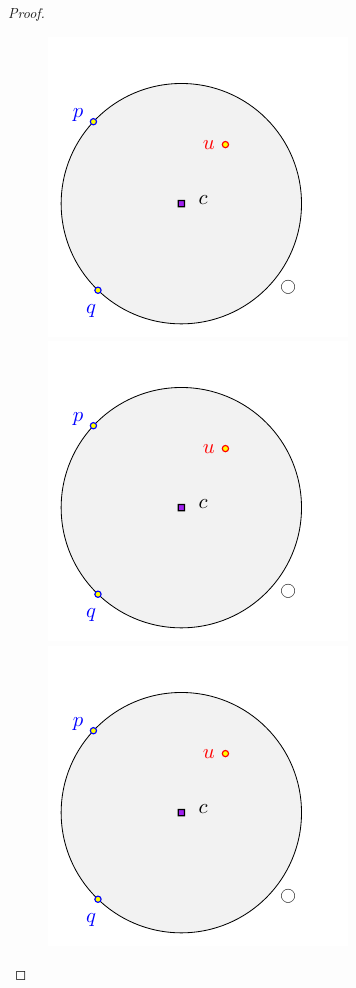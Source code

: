 \documentclass[12pt]{article}%
\begin{document}
\begin{proof}
    \begin{figure}[h]
        \phantom{}\hfill%
        \includegraphics[page=1]{figs/shrink}%
        \hfill%
        \includegraphics[page=2]{figs/shrink}%
        \hfill%
        \includegraphics[page=3]{figs/shrink}%
        \hfill%
        \phantom{}%
        \caption{}

\end{figure}
\end{proof}
\end{document}
